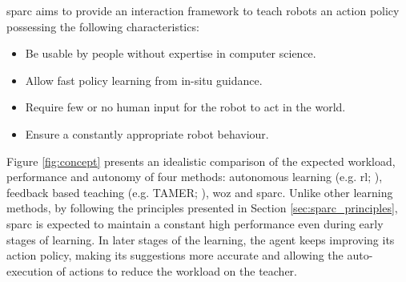\gls{sparc} aims to provide an interaction framework to teach robots an action policy possessing the following characteristics:
\begin{itemize}
	\item Be usable by people without expertise in computer science.
	\item Allow fast policy learning from in-situ guidance.
	\item Require few or no human input for the robot to act in the world.
	\item Ensure a constantly appropriate robot behaviour.
\end{itemize}

Figure \ref{fig:concept} presents an idealistic comparison of the expected workload, performance and autonomy of four methods: autonomous learning (e.g. \gls{rl}; \citealt{sutton1998reinforcement}), feedback based teaching (e.g. TAMER; \citealt{knox2009interactively}), \gls{woz} \citep{riek2012wizard} and \gls{sparc}. Unlike other learning methods, by following the principles presented in Section \ref{sec:sparc_principles}, \gls{sparc} is expected to maintain a constant high performance even during early stages of learning. In later stages of the learning, the agent keeps improving its action policy, making its suggestions more accurate and allowing the auto-execution of actions to reduce the workload on the teacher.

